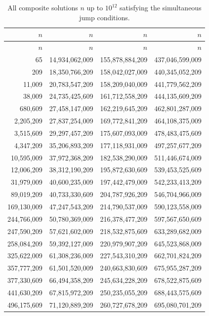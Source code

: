 \documentclass[12pt, twoside]{amsart}
\theoremstyle{definition}
\begin{document}
\small
\begin{longtable}{rrrr}
\caption{All composite solutions $n$ up to $10^{12}$ satisfying the simultaneous jump conditions.}
\label{tab:solutions}\\
\toprule 
$n$ & $n$ & $n$ & $n$ \\
\midrule
\endfirsthead

\toprule
$n$ & $n$ & $n$ & $n$ \\
\midrule
\endhead
65 & 14,934,062,009 & 155,878,884,209 & 437,046,599,009 \\
209 & 18,350,766,209 & 158,042,027,009 & 440,345,052,209 \\
11,009 & 20,783,547,209 & 158,209,040,009 & 441,779,562,209 \\
38,009 & 24,735,425,609 & 161,712,558,209 & 444,135,609,209 \\
680,609 & 27,458,147,009 & 162,219,645,209 & 462,801,287,009 \\
2,205,209 & 27,837,254,009 & 169,772,841,209 & 464,108,375,009 \\
3,515,609 & 29,297,457,209 & 175,607,093,009 & 478,483,475,609 \\
4,347,209 & 35,206,893,209 & 177,118,931,009 & 497,257,677,209 \\
10,595,009 & 37,972,368,209 & 182,538,290,009 & 511,446,674,009 \\
12,006,209 & 38,312,190,209 & 195,872,630,609 & 539,453,525,609 \\
31,979,009 & 40,600,235,009 & 197,442,479,009 & 542,233,413,209 \\
89,019,209 & 40,733,330,609 & 204,787,926,209 & 546,704,966,009 \\
169,130,009 & 47,247,543,209 & 214,790,537,009 & 590,123,558,009 \\
244,766,009 & 50,780,369,009 & 216,378,477,209 & 597,567,650,609 \\
247,590,209 & 57,621,602,009 & 218,532,875,609 & 633,289,682,009 \\
258,084,209 & 59,392,127,009 & 220,979,907,209 & 645,523,868,009 \\
325,622,009 & 61,308,236,009 & 227,543,310,209 & 662,701,824,209 \\
357,777,209 & 61,501,520,009 & 240,663,830,609 & 675,955,287,209 \\
377,330,609 & 66,494,358,209 & 245,634,228,209 & 678,522,875,609 \\
441,630,209 & 67,815,972,209 & 250,235,055,209 & 688,443,575,609 \\
496,175,609 & 71,120,889,209 & 260,727,678,209 & 695,080,701,209 \\

\end{longtable}
\end{document}

